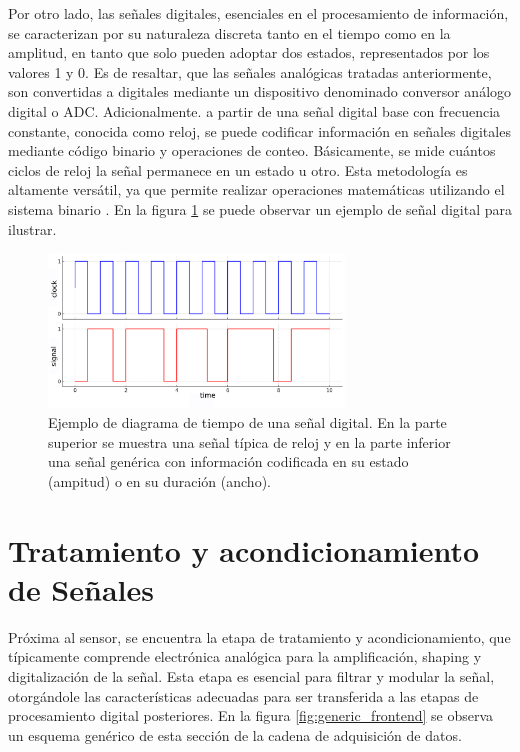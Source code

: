 \documentclass[]{book}
\begin{document}
\noindent Por otro lado, las señales digitales, esenciales en el procesamiento de información, se caracterizan por su naturaleza discreta tanto en el tiempo como en la amplitud, en tanto que solo pueden adoptar dos estados, representados por los valores 1 y 0. Es de resaltar, que las señales analógicas tratadas anteriormente, son convertidas a digitales mediante un dispositivo denominado conversor análogo digital o ADC. Adicionalmente. a partir de una señal digital base con frecuencia constante, conocida como reloj, se puede codificar información en señales digitales mediante código binario y operaciones de conteo. Básicamente, se mide cuántos ciclos de reloj la señal permanece en un estado u otro. Esta metodología es altamente versátil, ya que permite realizar operaciones matemáticas utilizando el sistema binario \cite{brown2000fundamentals}. En la figura \ref{fig:digital_siganl} se puede observar un ejemplo de señal digital para ilustrar.

\begin{figure}[h]
    \centering
    \includegraphics[width=0.7\textwidth]{digital_signal.png}
    \caption{Ejemplo de diagrama de tiempo de una señal digital. En la parte superior se muestra una señal típica de reloj y en la parte inferior una señal genérica con información codificada en su estado (ampitud) o en su duración (ancho).}
    \label{fig:digital_siganl}

\end{figure}

\section{Tratamiento y acondicionamiento de Señales}

\noindent Próxima al sensor, se encuentra la etapa de tratamiento y acondicionamiento, que típicamente comprende electrónica analógica para la amplificación, shaping y digitalización de la señal. Esta etapa es esencial para filtrar y modular la señal, otorgándole las características adecuadas para ser transferida a las etapas de procesamiento digital posteriores. En la figura \ref{fig:generic_frontend} se observa un esquema genérico de esta sección de la cadena de adquisición de datos.\\
\end{document}
